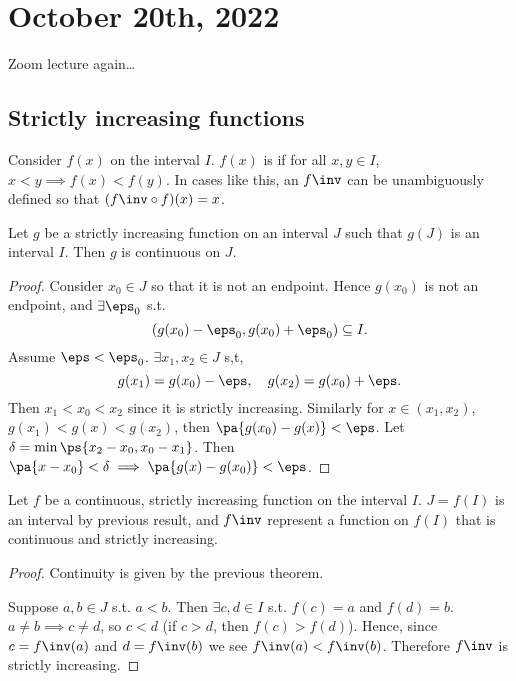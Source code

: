 \documentclass[11pt]{scrartcl}
\numberwithin{equation}{section}
\begin{document}
\section{October 20th, 2022}
Zoom lecture again\dots
\subsection{Strictly increasing functions}
\begin{definition}
    Consider $f(x)$ on the interval $I$. $f(x)$ is  if for all $x,y\in I$, $x<y \implies f(x)<f(y)$.
    In cases like this, an  $f\inv$ can 
    be unambiguously defined so that $(f\inv\circ f)(x) = x$.
\end{definition}

\begin{theorem}
    Let $g$ be a strictly increasing function on an interval $J$ 
    such that $g(J)$ is an interval $I$. Then $g$ is continuous on $J$.
\end{theorem}

\begin{proof}
    Consider $x_0\in J$ so that it is not 
    an endpoint. Hence $g(x_0)$ is not an endpoint, and $\exists \eps_0$
    s.t. \[ (g(x_0)-\eps_0, g(x_0) +\eps_0) \subseteq I.\]
    Assume $\eps<\eps_0$. $\exists x_1,x_2\in J$ s,t,
    \[
        g(x_1)=g(x_0) - \eps, \quad g(x_2)=g(x_0) + \eps.
    \]
    Then $x_1<x_0<x_2$ since it is strictly 
    increasing. Similarly for $x\in(x_1,x_2)$, $g(x_1) < g(x)  < g(x_2)$,
    then $\pa{g(x_0)-g(x)}<\eps$. Let $\delta = \min\ps{x_2-x_0, x_0-x_1}$.
    Then $\pa{x-x_0}<\delta \implies \pa{g(x)-g(x_0)}<\eps$.
\end{proof}

\begin{theorem}
    Let $f$ be a continuous, strictly increasing function on the 
    interval $I$. $J=f(I)$ is an interval by previous result,
    and $f\inv$ represent a function on $f(I)$ that is continuous 
    and strictly increasing.
\end{theorem}

\begin{proof}
    Continuity is given by the previous theorem.

    Suppose $a,b\in J$ s.t. $a<b$. Then $\exists c,d \in I$ s.t. 
    $f(c)=a$ and $f(d)=b$. $a\neq b\implies c\neq d$, so 
    $c<d$ (if $c>d$, then $f(c)>f(d)$). Hence, since $c=f\inv(a)$
    and $d=f\inv(b)$ we see $f\inv(a)<f\inv(b)$.
    Therefore $f\inv$ is strictly increasing.
\end{proof}
\end{document}
